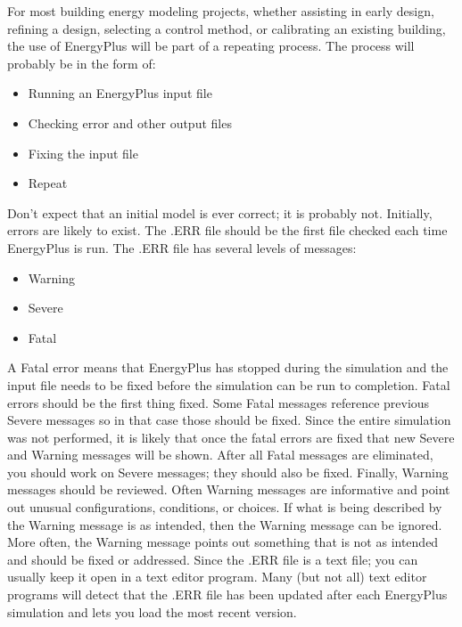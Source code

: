 For most building energy modeling projects, whether assisting in early
design, refining a design, selecting a control method, or calibrating
an existing building, the use of EnergyPlus will be part of a repeating
process. The process will probably be in the form of:
\begin{itemize}
\item Running an EnergyPlus input file
\item Checking error and other output files
\item Fixing the input file
\item Repeat
\end{itemize}
Don't expect that an initial model is ever correct; it is probably
not. Initially, errors are likely to exist. The .ERR file should be
the first file checked each time EnergyPlus is run. The .ERR file
has several levels of messages:
\begin{itemize}
\item Warning
\item Severe
\item Fatal
\end{itemize}
A Fatal error means that EnergyPlus has stopped during the simulation
and the input file needs to be fixed before the simulation can be
run to completion. Fatal errors should be the first thing fixed. Some
Fatal messages reference previous Severe messages so in that case
those should be fixed. Since the entire simulation was not performed,
it is likely that once the fatal errors are fixed that new Severe
and Warning messages will be shown. After all Fatal messages are eliminated,
you should work on Severe messages; they should also be fixed. Finally,
Warning messages should be reviewed. Often Warning messages are informative
and point out unusual configurations, conditions, or choices. If what
is being described by the Warning message is as intended, then the
Warning message can be ignored. More often, the Warning message points
out something that is not as intended and should be fixed or addressed.
Since the .ERR file is a text file; you can usually keep it open in
a text editor program. Many (but not all) text editor programs will
detect that the .ERR file has been updated after each EnergyPlus simulation
and lets you load the most recent version.

